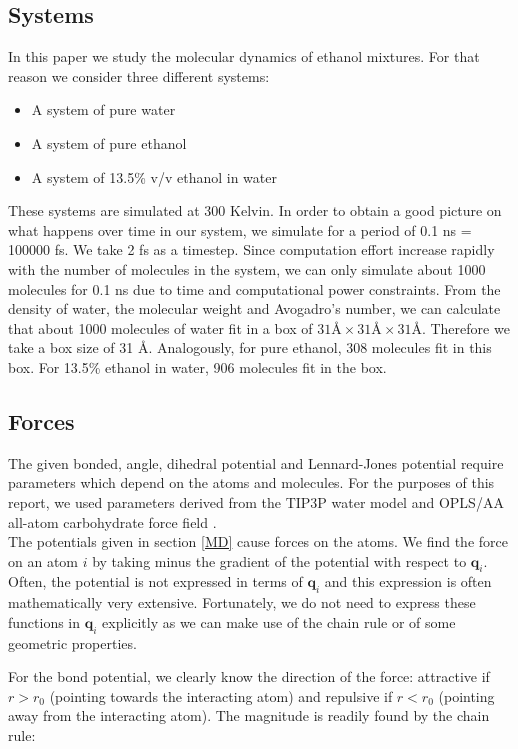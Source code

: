 \documentclass[11pt,a4paper]{article}
\begin{document}
\subsection{Systems}
\label{system}
In this paper we study the molecular dynamics of ethanol mixtures. For that reason we consider three different systems:
\begin{itemize}
\item A system of pure water
\item A system of pure ethanol
\item A system of 13.5\% v/v ethanol in water
\end{itemize}
These systems are simulated at 300 Kelvin. In order to obtain a good picture on what happens over time in our system, we simulate for a period of 0.1 ns = 100000 fs. We take 2 fs as a timestep. Since computation effort increase rapidly with the number of molecules in the system, we can only simulate about 1000 molecules for 0.1 ns due to time and computational power constraints. From the density of water, the molecular weight and Avogadro's number, we can calculate that about 1000 molecules of water fit in a box of $31 \text{\AA} \times 31 \text{\AA} \times 31 \text{\AA}$. Therefore we take a box size of 31 \AA. Analogously, for pure ethanol, 308 molecules fit in this box. For 13.5\% ethanol in water, 906 molecules fit in the box.   

\subsection{Forces}
The given bonded, angle, dihedral potential and Lennard-Jones potential require parameters which depend on the atoms and molecules. For the purposes of this report, we used parameters derived from the TIP3P water model \cite{tip3p} and OPLS/AA all-atom carbohydrate force field \cite{oplsaa}. \\The potentials given in section \ref{MD} cause forces on the atoms. We find the force on an atom $i$ by taking minus the gradient of the potential with respect to $\textbf{q}_i$. Often, the potential is not expressed in terms of $\textbf{q}_i$ and this expression is often mathematically very extensive. Fortunately, we do not need to express these functions in $\textbf{q}_i$ explicitly as we can make use of the chain rule or of some geometric properties.

For the bond potential, we clearly know the direction of the force: attractive if $r > r_0$ (pointing towards the interacting atom) and repulsive if $r < r_0$ (pointing away from the interacting atom). The magnitude is readily found by the chain rule:    
\end{document}
